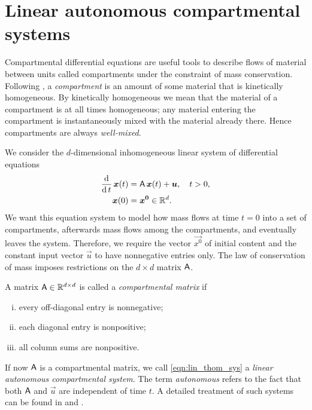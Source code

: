 \documentclass[smallextended]{svjour3}
\newcommand{\R}{\mathbb{R}}
\newcommand{\deriv}[1]{\frac{\operatorname{d}}{\operatorname{d}#1}}
\begin{document}
\section{Linear autonomous compartmental systems}\label{sec:one_particle}
Compartmental differential equations are useful tools to describe flows of material between units called compartments under the constraint of mass conservation.
Following \citet{Jacquez1993SIAM}, a \emph{compartment} is an amount of some material that is kinetically homogeneous.
By kinetically homogeneous we mean that the material of a compartment is at all times homogeneous; any material entering the compartment is instantaneously mixed with the material already there.
Hence compartments are always \emph{well-mixed}.

We consider the $d$-dimensional inhomogeneous linear system of differential equations
\begin{equation}\label{eqn:lin_thom_sys}
\begin{aligned}
    \deriv{t}\,\vec{x}(t) &= \tens{A}\,\vec{x}(t) + \vec{u},\quad t>0,\\
    \vec{x}(0) &= \vec{x^0}\in\R^d.
\end{aligned}
\end{equation}
We want this equation system to model how mass flows at time $t=0$ into a set of compartments, afterwards mass flows among the compartments, and eventually leaves the system.
Therefore, we require the vector $\vec{x^0}$ of initial content and the constant input vector $\vec{u}$ to have nonnegative entries only.
The law of conservation of mass imposes restrictions on the $d\times d$ matrix $\mathsf{A}$.

\begin{definition}
    A matrix $\tens{A}\in\R^{d\times d}$ is called a \emph{compartmental matrix} if
    \begin{enumerate}[(i)]
        \item every off-diagonal entry is nonnegative;
        \item each diagonal entry is nonpositive;
        \item all column sums are nonpositive.
    \end{enumerate}
\end{definition}
If now $\mathsf{A}$ is a compartmental matrix, we call \eqref{eqn:lin_thom_sys} a \emph{linear autonomous compartmental system}.
The term \emph{autonomous} refers to the fact that both $\mathsf{A}$ and $\vec{u}$ are independent of time $t$.
A detailed treatment of such systems can be found in \citet{Anderson1983} and \citet{Jacquez1993SIAM}.
\end{document}
